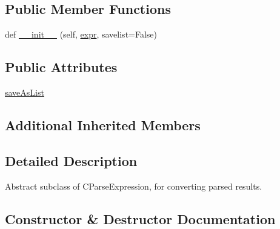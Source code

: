 \subsection*{Public Member Functions}
\begin{DoxyCompactItemize}
\item 
def \hyperlink{classsetuptools_1_1__vendor_1_1pyparsing_1_1TokenConverter_a93c81a9a0c4da7bd9ceb4286d15946a8}{\+\_\+\+\_\+init\+\_\+\+\_\+} (self, \hyperlink{classsetuptools_1_1__vendor_1_1pyparsing_1_1ParseElementEnhance_a445450bd765a74cc1d1567e40cade40d}{expr}, savelist=False)
\end{DoxyCompactItemize}
\subsection*{Public Attributes}
\begin{DoxyCompactItemize}
\item 
\hyperlink{classsetuptools_1_1__vendor_1_1pyparsing_1_1TokenConverter_a78379695505b245d7aba12470923d760}{save\+As\+List}
\end{DoxyCompactItemize}
\subsection*{Additional Inherited Members}


\subsection{Detailed Description}
\begin{DoxyVerb}Abstract subclass of C{ParseExpression}, for converting parsed results.
\end{DoxyVerb}
 

\subsection{Constructor \& Destructor Documentation}
\mbox{\label{classsetuptools_1_1__vendor_1_1pyparsing_1_1TokenConverter_a93c81a9a0c4da7bd9ceb4286d15946a8}} 
